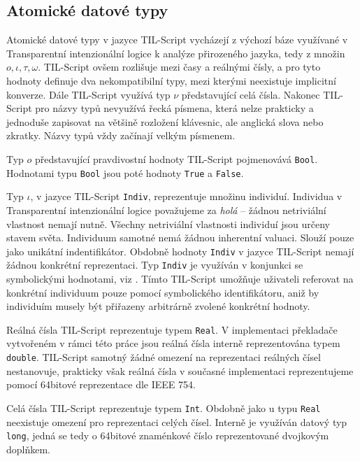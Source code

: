 \subsection{Atomické datové typy}

Atomické datové typy v jazyce TIL-Script vycházejí z výchozí báze využívané v Transparentní
intenzionální logice k analýze přirozeného jazyka, tedy z množin ${o, \iota, \tau, \omega}$. TIL-Script ovšem
rozlišuje mezi časy a reálnými čísly, a pro tyto hodnoty definuje dva nekompatibilní typy, mezi
kterými neexistuje implicitní konverze. Dále TIL-Script využívá typ $\nu$ představující celá
čísla. Nakonec TIL-Script pro názvy typů nevyužívá řecká písmena, která nelze prakticky a jednoduše
zapisovat na většině rozložení klávesnic, ale anglická slova nebo zkratky. Názvy typů vždy začínají
velkým písmenem.

Typ $o$ představující pravdivostní hodnoty TIL-Script pojmenovává \lstinline{Bool}. Hodnotami typu
\lstinline{Bool} jsou poté hodnoty \lstinline{True} a \lstinline{False}.

Typ $\iota$, v jazyce TIL-Script \lstinline{Indiv}, reprezentuje množinu individuí. Individua
v Transparentní intenzionální logice považujeme za \textit{holá} -- žádnou netriviální vlastnost
nemají nutně. Všechny netriviální vlastnosti individuí jsou určeny stavem světa. Individuum samotné
nemá žádnou inherentní valuaci. Slouží pouze jako unikátní indentifikátor. Obdobně hodnoty
\lstinline{Indiv} v jazyce TIL-Script nemají žádnou konkrétní reprezentaci. Typ \lstinline{Indiv}
je využíván v konjunkci se symbolickými hodnotami, viz . Tímto TIL-Script
umožňuje uživateli referovat na konkrétní individuum pouze pomocí symbolického identifikátoru,
aniž by individuím musely být přiřazeny arbitrárně zvolené konkrétní hodnoty.

Reálná čísla TIL-Script reprezentuje typem \lstinline{Real}. V implementaci překladače vytvořeném
v rámci této práce jsou reálná čísla interně reprezentována typem \lstinline{double}. TIL-Script
samotný žádné omezení na reprezentaci reálných čísel nestanovuje, prakticky však reálná čísla
v současné implementaci reprezentujeme pomocí 64bitové reprezentace dle IEEE 754.

Celá čísla TIL-Script reprezentuje typem \lstinline{Int}. Obdobně jako u typu \lstinline{Real}
neexistuje omezení pro reprezentaci celých čísel. Interně je využíván datový typ \lstinline{long},
jedná se tedy o 64bitové znaménkové číslo reprezentované dvojkovým doplňkem.

